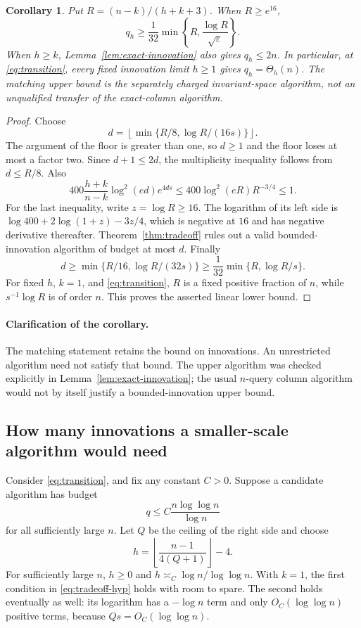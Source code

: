 \documentclass[11pt]{article}
\newtheorem{corollary}[theorem]{Corollary}
\theoremstyle{definition}
\begin{document}
\begin{corollary}\label{cor:bounded}
Put $R=(n-k)/(h+k+3)$. When $R\ge e^{16}$,
\begin{equation}\label{eq:bounded}
 q_h\ge\frac1{32}\min\left\{R,\frac{\log R}{\sqrt\varepsilon}\right\}.
\end{equation}
When $h\ge k$, Lemma~\ref{lem:exact-innovation} also gives $q_h\le2n$. In particular, at \eqref{eq:transition}, every fixed innovation limit $h\ge1$ gives $q_h=\Theta_h(n)$. The matching upper bound is the separately charged invariant-space algorithm, not an unqualified transfer of the exact-column algorithm.
\end{corollary}
\begin{proof}
Choose
\[
 d=\left\lfloor\min\{R/8,\log R/(16s)\}\right\rfloor.
\]
The argument of the floor is greater than one, so $d\ge1$ and the floor loses at most a factor two. Since $d+1\le2d$, the multiplicity inequality follows from $d\le R/8$. Also
\[
 400\frac{h+k}{n-k}\log^2(ed)e^{4ds}
 \le400\log^2(eR)R^{-3/4}\le1.
\]
For the last inequality, write $z=\log R\ge16$. The logarithm of its left side is $\log400+2\log(1+z)-3z/4$, which is negative at $16$ and has negative derivative thereafter. Theorem~\ref{thm:tradeoff} rules out a valid bounded-innovation algorithm of budget at most $d$. Finally
\[
 d\ge\min\{R/16,\log R/(32s)\}
 \ge\frac1{32}\min\{R,\log R/s\}.
\]
For fixed $h$, $k=1$, and \eqref{eq:transition}, $R$ is a fixed positive fraction of $n$, while $s^{-1}\log R$ is of order $n$. This proves the asserted linear lower bound.
\end{proof}

\paragraph{Clarification of the corollary.}
The matching statement retains the bound on innovations. An unrestricted algorithm need not satisfy that bound. The upper algorithm was checked explicitly in Lemma~\ref{lem:exact-innovation}; the usual $n$-query column algorithm would not by itself justify a bounded-innovation upper bound.

\subsection{How many innovations a smaller-scale algorithm would need}
Consider \eqref{eq:transition}, and fix any constant $C>0$. Suppose a candidate algorithm has budget
\[
 q\le C\frac{n\log\log n}{\log n}
\]
for all sufficiently large $n$. Let $Q$ be the ceiling of the right side and choose
\[
 h=\left\lfloor\frac{n-1}{4(Q+1)}\right\rfloor-4.
\]
For sufficiently large $n$, $h\ge0$ and $h\asymp_C\log n/\log\log n$. With $k=1$, the first condition in \eqref{eq:tradeoff-hyp} holds with room to spare. The second holds eventually as well: its logarithm has a $-\log n$ term and only $O_C(\log\log n)$ positive terms, because $Qs=O_C(\log\log n)$.
\end{document}

